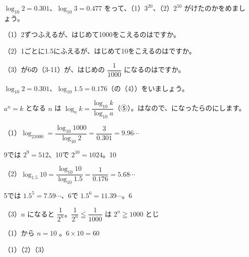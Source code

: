 \begin{jibun}
$\log_{10}2=0.301$、$\log_{10}3=0.477$ をって、（1）$3^{20}$、（2）$2^{50}$ がけたのかをめましょう。
\end{jibun}

\begin{reidai}[\R{何回}{なん|かい}で\R{何倍}{なん|ばい}をこえるか]
（1）2ずつふえるが、はじめて1000をこえるのはですか。\par
（2）1ごとに1.5にふえるが、はじめて10をこえるのはですか。\par
（3）が6の（3-11）が、はじめの $\dfrac{1}{1000}$ になるのはですか。\par
$\log_{10}2=0.301$、$\log_{10}1.5=0.176$（の（4））をいましょう。\par
\kangaekata $a^n=k$ となる $n$ は $\log_ak=\dfrac{\log_{10}k}{\log_{10}a}$（⑤）。はなので、になったらのにします。\par
\shiki（1）\nobreak $\log_21000=\dfrac{\log_{10}1000}{\log_{10}2}=\dfrac{3}{0.301}=9.96\cdots$\par
\hspace*{2.6\zw}9では $2^9=512$、10で $2^{10}=1024$。10\par
\hspace*{2.6\zw}（2）\nobreak $\log_{1.5}10=\dfrac{\log_{10}10}{\log_{10}1.5}=\dfrac{1}{0.176}=5.68\cdots$\par
\hspace*{2.6\zw}5では $1.5^5=7.59\cdots$、6で $1.5^6=11.39\cdots$。6\par
\hspace*{2.6\zw}（3）\nobreak $n$ になると $\dfrac{1}{2^n}$。$\dfrac{1}{2^n}\leqq\dfrac{1}{1000}$ は $2^n\geqq1000$ とじ\par
\hspace*{4.6\zw}（1）から $n=10$ 。$6\times10=60$\par
\kotae（1）\quad（2）\quad（3）
\end{reidai}

